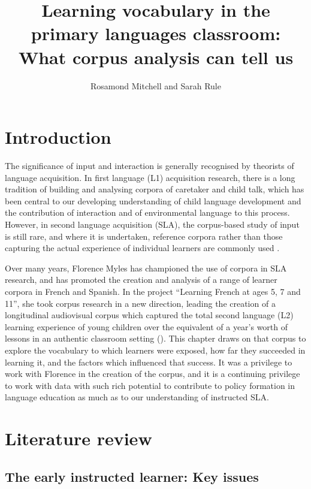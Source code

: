\documentclass[output=paper]{langscibook}
\author{Rosamond Mitchell\orcid{}\affiliation{University of Southampton} and Sarah Rule\orcid{}\affiliation{University of Southampton}}
\title[Learning vocabulary in the primary languages classroom]
      {Learning vocabulary in the primary languages classroom: What corpus analysis can tell us}
\begin{document}
\maketitle 

\section{Introduction}

The significance of input and interaction is generally recognised by theorists of language acquisition. In first language (L1) acquisition research, there is a long tradition of building and analysing corpora of caretaker and child talk, which has been central to our developing understanding of child language development and the contribution of interaction and of environmental language to this process. However, in second language acquisition (SLA), the corpus-based study of input is still rare, and where it is undertaken, reference corpora rather than those capturing the actual experience of individual learners are commonly used \citep{Mitchell2021}. 

Over many years, Florence Myles has championed the use of corpora in SLA research, and has promoted the creation and analysis of a range of learner corpora in French and Spanish. In the project ``Learning French at ages 5, 7 and 11'', she took corpus research in a new direction, leading the creation of a longitudinal audiovisual corpus which captured the total second language (L2) learning experience of young children over the equivalent of a year’s worth of lessons in an authentic classroom setting (\citealt{MylesEtAl2012,Myles2017}). This chapter draws on that corpus to explore the vocabulary to which learners were exposed, how far they succeeded in learning it, and the factors which influenced that success. It was a privilege to work with Florence in the creation of the corpus, and it is a continuing privilege to work with data with such rich potential to contribute to policy formation in language education as much as to our understanding of instructed SLA.

\section{Literature review}
\subsection{The early instructed learner: Key issues}
\end{document}
